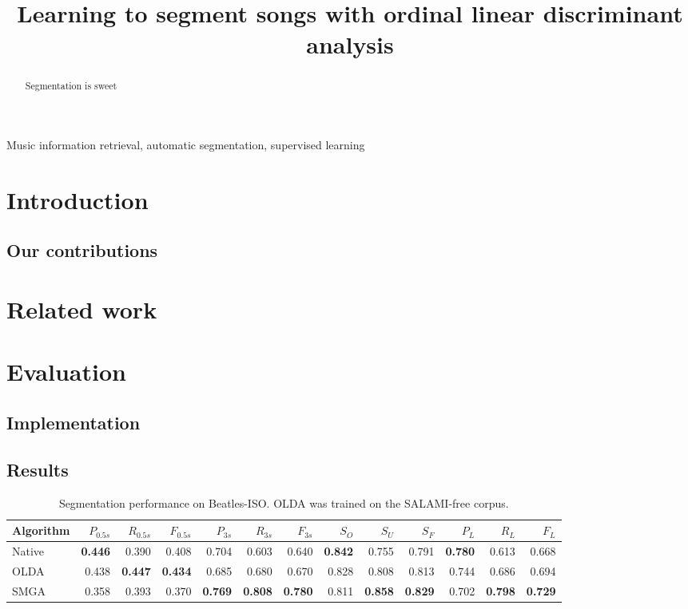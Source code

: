 \documentclass{article}
\title{Learning to segment songs with ordinal linear discriminant analysis}
\begin{document}
%
\maketitle
%
\begin{abstract}
Segmentation is sweet
\end{abstract}
%
\begin{keywords}
Music information retrieval, automatic segmentation, supervised learning
\end{keywords}
%
\section{Introduction}
\label{sec:intro}

\subsection{Our contributions}

\section{Related work}
\label{sec:related}

\section{Evaluation}
\label{sec:eval}

\subsection{Implementation}

\subsection{Results}
\label{sec:results}

\begin{table}[t]
\centering
\caption{Segmentation performance on Beatles-ISO. OLDA was trained on the SALAMI-free corpus.\label{tab:results:beatles}}
\begin{tabular}{lrrrrrrrrrrrr}
\toprule%
Algorithm   &   $P_{0.5s}$ & $R_{0.5s}$ & $F_{0.5s}$ & $P_{3s}$     & $R_{3s}$  & $F_{3s}$   & $S_O$ & $S_U$ & $S_F$ & $P_L$& $R_L$& $F_L$\\
\hline
Native      &   \textbf{0.446} & 0.390 & 0.408 & 0.704   & 0.603 & 0.640 & \textbf{0.842} & 0.755 & 0.791 & \textbf{0.780} & 0.613 & 0.668\\
OLDA        &   0.438 & \textbf{0.447} & \textbf{0.434} & 0.685   & 0.680 & 0.670 & 0.828 & 0.808 & 0.813 & 0.744 & 0.686 & 0.694\\
\hline
SMGA~\hfill\cite{serra2012unsupervised}
            &   0.358 & 0.393 & 0.370 & \textbf{0.769}   & \textbf{0.808} & \textbf{0.780} & 0.811 & \textbf{0.858} & \textbf{0.829} & 0.702 & \textbf{0.798} &
            \textbf{0.729}\\
\bottomrule%
\end{tabular}
\end{table}
\end{document}
